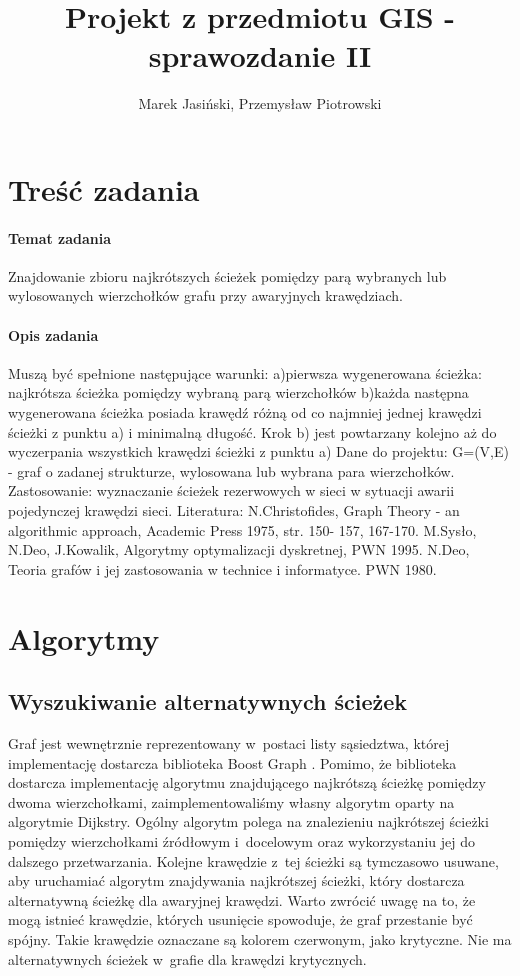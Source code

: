 \documentclass[a4paper, 12pt]{article}
\title {Projekt z przedmiotu GIS - sprawozdanie II}
\author{Marek Jasiński, Przemysław Piotrowski}
\begin{document}
\maketitle

\section{Treść zadania}

\paragraph{Temat zadania}
Znajdowanie zbioru najkrótszych ścieżek pomiędzy parą wybranych lub wylosowanych wierzchołków grafu przy awaryjnych krawędziach.

\paragraph{Opis zadania}
Muszą być spełnione następujące warunki: a)pierwsza wygenerowana ścieżka: najkrótsza ścieżka pomiędzy wybraną parą wierzchołków b)każda następna wygenerowana ścieżka posiada krawędź różną od co najmniej jednej krawędzi ścieżki z punktu a) i minimalną długość. Krok b) jest powtarzany kolejno aż do wyczerpania wszystkich krawędzi ścieżki z punktu a) Dane do projektu: G=(V,E) - graf o zadanej strukturze, wylosowana lub wybrana para wierzchołków. Zastosowanie: wyznaczanie ścieżek rezerwowych w sieci w sytuacji awarii pojedynczej krawędzi sieci. Literatura: N.Christofides, Graph Theory - an algorithmic approach, Academic Press 1975, str. 150- 157, 167-170. M.Sysło, N.Deo, J.Kowalik, Algorytmy optymalizacji dyskretnej, PWN 1995. N.Deo, Teoria grafów i jej zastosowania w technice i informatyce. PWN 1980.

\section{Algorytmy}

\subsection{Wyszukiwanie alternatywnych ścieżek}
\label{wyszukiwanie}
Graf jest wewnętrznie reprezentowany w~postaci listy sąsiedztwa, której implementację dostarcza biblioteka Boost Graph \cite{bgl}. Pomimo, że biblioteka dostarcza implementację algorytmu znajdującego najkrótszą ścieżkę pomiędzy dwoma wierzchołkami, zaimplementowaliśmy własny algorytm oparty na algorytmie Dijkstry. Ogólny algorytm polega na znalezieniu najkrótszej ścieżki pomiędzy wierzchołkami źródłowym i~docelowym oraz wykorzystaniu jej do dalszego przetwarzania. Kolejne krawędzie z~tej ścieżki są tymczasowo usuwane, aby uruchamiać algorytm znajdywania najkrótszej ścieżki, który dostarcza alternatywną ścieżkę dla awaryjnej krawędzi. Warto zwrócić uwagę na to, że mogą istnieć krawędzie, których usunięcie spowoduje, że graf przestanie być spójny. Takie krawędzie oznaczane są kolorem czerwonym, jako krytyczne. Nie ma alternatywnych ścieżek w~grafie dla krawędzi krytycznych.
\end{document}

